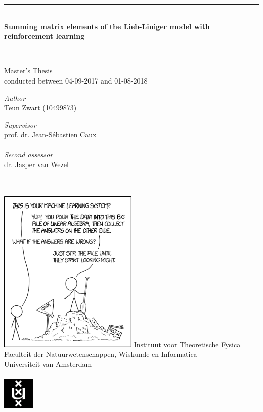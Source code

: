 \documentclass[11pt, a4paper]{report} %
\begin{document}
\begin{titlepage}
	\begin{center}
		\rule{\textwidth}{0.4mm}\\[0.5cm]
		\huge{\textbf{Summing matrix elements of the Lieb-Liniger model with reinforcement learning\\}}
		\rule{\textwidth}{0.4mm}\\[0.5cm]
		\large{Master's Thesis\\conducted between 04-09-2017 and 01-08-2018}\\[0.5cm]
		\begin{minipage}[t]{0.4\textwidth}
			\begin{flushleft}
				\large\emph{Author}\\{Teun Zwart (10499873)}
			\end{flushleft}
		\end{minipage}
		\begin{minipage}[t]{0.4\textwidth}
			\begin{flushright}
				\large\emph{Supervisor}\\{prof. dr. Jean-Sébastien Caux}\\~\\
				\large\emph{Second assessor}\\{dr. Jasper van Wezel}\\~\\~\\
			\end{flushright}
		\end{minipage}
		\includegraphics[width=0.5\textwidth]{machine_learning_2x.png}
		\vfill
		\large{Instituut voor Theoretische Fysica}\\
		\large{Faculteit der Natuurwetenschappen, Wiskunde en Informatica}\\
		\large{Universiteit van Amsterdam}\\~\\
		\includegraphics[width=1.5cm]{UvA-logo.png}
	\end{center}
\end{titlepage}
\end{document}
